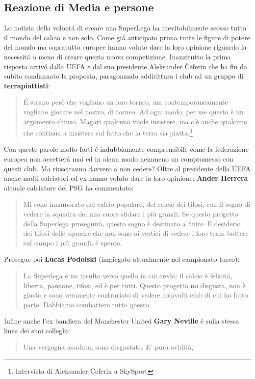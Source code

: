 \documentclass[
    corpo=12pt,
    oneside,
    evenboxes,
    tipotesi=triennale,
    stile=classica,
    oldstyle,
    autoretitolo,
    greek,
]{toptesi}
\begin{document}
\begin{interlinea}{1.5}
\section{Reazione di Media e persone}
Lo notizia della volont\'a di creare una SuperLega ha inevitabilmente scosso tutto il mondo del calcio e non solo. Come gi\'a anticipato prima 
tutte le figure di potere del mondo ma sopratutto europee hanno voluto dare la loro opinione riguardo la necessit\'a o meno di creare questa nuova competizione.
Inanzitutto la prima risposta arriv\'o dalla UEFA e dal suo presidente Aleksander Čeferin che ha fin da subito condannato la proposta, paragonando
addirittura i club ad un gruppo di \textbf{terrapiattisti}: \begin{quote}\small \'E strano però che vogliano un loro torneo, ma contemporaneamente vogliano giocare nel nostro, 
di torneo. Ad ogni modo, per me questo è un argomento chiuso. Magari qualcuno vuole insistere, ma c’è anche qualcuno che continua a insistere sul fatto 
che la terra sia piatta.\footnote{Intervista di Aleksander Čeferin a SkySport}\end{quote} Con queste parole molto forti \'e indubbiamente comprensibile come la federazione europea non accetter\'a mai 
ed in alcun modo nemmeno un compromesso con questi club. Ma riusciranno davvero a non cedere?\newline
Oltre al presidente della UEFA anche molti calciatori ed ex hanno voluto dare la loro opinione: \textbf{Ander Herrera} attuale calciatore del PSG ha commentato: 
\begin{quote}\small Mi sono innamorato del calcio popolare, del calcio dei tifosi, con il sogno di vedere la squadra del mio cuore sfidare i più grandi. Se questo progetto 
della Superlega proseguirà, questo sogno è destinato a finire. Il desiderio dei tifosi delle squadre che non sono ai vertici di vedere i loro team battere 
sul campo i più grandi, è spento.\end{quote} Prosegue poi \textbf{Lucas Podolski} (impiegato attualmente nel campionato turco): \begin{quote}\small La Superlega è un insulto verso quello 
in cui credo: il calcio è felicità, liberta, passione, tifosi, ed è per tutti. Questo progetto mi disgusta, non è giusto e sono veramente contrariato di vedere coinvolti 
club di cui ho fatto parte. Dobbiamo combattere tutto questo.\end{quote}
Infine anche l'ex bandiera del Manchester United \textbf{Gary Neville} \'e sulla stessa linea dei suoi colleghi: \begin{quote}\small Una vergogna assoluta, sono disgustato. E' pura avidità,

\end{quote}
\end{interlinea}
\end{document}
